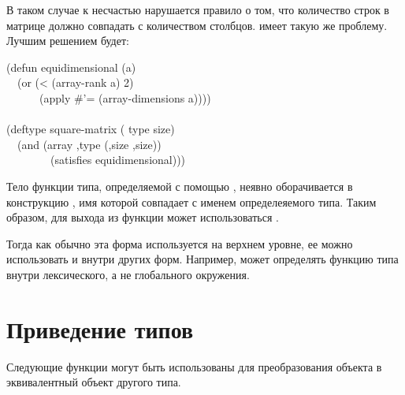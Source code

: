 \begin{defmac}
В таком случае к несчастью нарушается правило о том, что количество строк в
матрице должно совпадать с количеством столбцов.  имеет
такую же проблему.
Лучшим решением будет:
\begin{lisp}
(defun equidimensional (a) \\
~~(or (< (array-rank a) 2) \\
~~~~~~(apply \#'= (array-dimensions a)))) \\
 \\
(deftype square-matrix ( type size) \\
~~{\Xbq}(and (array ,type (,size ,size)) \\
~~~~~~~~(satisfies equidimensional)))
\end{lisp}

Тело функции типа, определяемой с помощью , неявно оборачивается в
конструкцию , имя которой совпадает с именем определеяемого типа.
Таким образом, для выхода из функции может использоваться .

Тогда как обычно эта форма используется на верхнем уровне, ее можно
использовать и внутри других форм.
Например,  может определять функцию типа внутри лексического, а не
глобального окружения.
\end{defmac}

\section{Приведение типов}

Следующие функции могут быть использованы для преобразования объекта в
эквивалентный объект другого типа.

